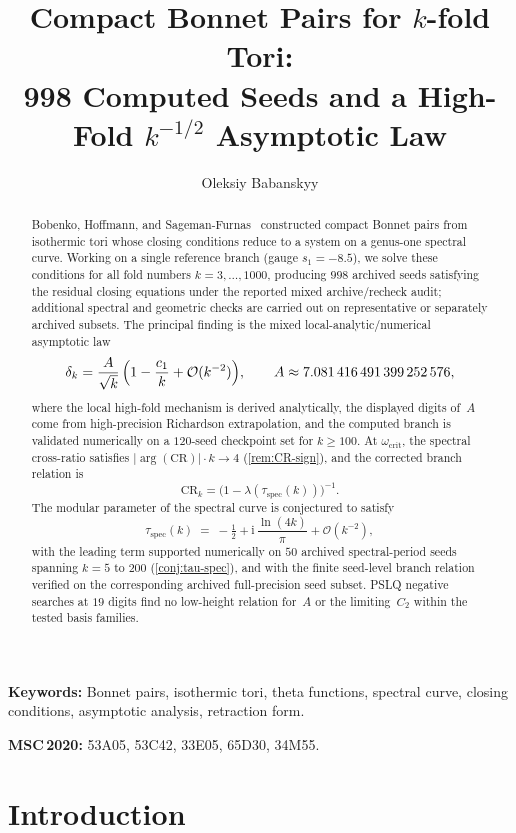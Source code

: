 \documentclass[11pt,a4paper]{article}
\title{%
  Compact Bonnet Pairs for $k$-fold Tori:\\
  998 Computed Seeds and a High-Fold $k^{-1/2}$
  Asymptotic Law}
\author{%
  Oleksiy Babanskyy
}
\date{}
\theoremstyle{plain}
\theoremstyle{definition}
\theoremstyle{remark}
\newcommand{\ii}{\mathrm{i}}
\newcommand{\Oo}{\mathcal{O}}
\begin{document}
\maketitle

\begin{abstract}
Bobenko, Hoffmann, and Sageman-Furnas~\cite{BHS25} constructed
compact Bonnet pairs from isothermic tori whose closing conditions
reduce to a system on a genus-one spectral curve.
Working on a single reference branch (gauge $s_1=-8.5$), we solve
these conditions for all fold numbers $k=3,\ldots,1000$, producing
$998$ archived seeds satisfying the residual closing equations under the
reported mixed archive/recheck audit; additional spectral and geometric
checks are carried out on representative or separately archived subsets.
The principal finding is the mixed local-analytic/numerical
asymptotic law
\[
  \delta_k = \frac{A}{\sqrt{k}}\,\Bigl(1 - \frac{c_1}{k}
  + \Oo(k^{-2})\Bigr),
  \qquad A \approx 7.081\,416\,491\,399\,252\,576,
\]
where the local high-fold mechanism is derived analytically, the
displayed digits of~$A$ come from high-precision Richardson
extrapolation, and the computed branch is validated numerically on a
$120$-seed checkpoint set for $k\ge100$.  At $\omega_{\mathrm{crit}}$, the spectral
cross-ratio satisfies $\lvert\arg(\mathrm{CR})\rvert\cdot k\to4$
(\cref{rem:CR-sign}), and the corrected branch relation is
\[
  \mathrm{CR}_k = \bigl(1-\lambda(\tau_{\mathrm{spec}}(k))\bigr)^{-1}.
\]
The modular parameter of the spectral curve is conjectured to satisfy
\[
  \tau_{\mathrm{spec}}(k)
  \;=\; -\tfrac{1}{2} + \ii\,\frac{\ln(4k)}{\pi}
  + \Oo(k^{-2}),
\]
with the leading term supported numerically on $50$ archived
spectral-period seeds spanning $k=5$ to $200$
(\cref{conj:tau-spec}), and with the finite seed-level branch relation
verified on the corresponding archived full-precision seed subset.
PSLQ negative searches at $19$ digits find no
low-height relation for~$A$ or the limiting~$C_2$ within the tested
basis families.
\end{abstract}

\smallskip
\noindent\textbf{Keywords:}
  Bonnet pairs, isothermic tori, theta functions, spectral curve,
  closing conditions, asymptotic analysis, retraction form.

\smallskip
\noindent\textbf{MSC\,2020:}
  53A05, 53C42, 33E05, 65D30, 34M55.

\section{Introduction}\label{sec:intro}
\end{document}
